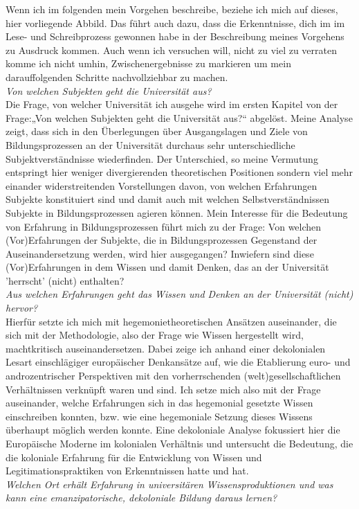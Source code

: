 Wenn ich im folgenden mein Vorgehen beschreibe, beziehe ich mich auf dieses,
hier vorliegende  Abbild. Das führt auch dazu, dass die Erkenntnisse, dich im
im Lese- und Schreibprozess gewonnen habe in der Beschreibung meines Vorgehens
zu Ausdruck kommen. Auch wenn ich versuchen will, nicht zu viel zu verraten
komme ich nicht umhin, Zwischenergebnisse zu markieren um mein darauffolgenden
Schritte nachvollziehbar zu machen.\\[0.75em]
\textit{Von welchen Subjekten geht die Universität aus?}\\
Die Frage, von
welcher Universität ich ausgehe wird im ersten Kapitel von der Frage:„Von
welchen Subjekten geht die Universität aus?“ abgelöst. Meine Analyse zeigt,
dass sich in den Überlegungen über Ausgangslagen und Ziele von
Bildungsprozessen an der Universität durchaus sehr unterschiedliche
Subjektverständnisse wiederfinden. Der Unterschied, so meine Vermutung
entspringt hier weniger divergierenden theoretischen Positionen sondern viel
mehr einander widerstreitenden Vorstellungen davon, von welchen Erfahrungen
Subjekte konstituiert sind und damit auch mit welchen Selbstverständnissen
Subjekte in Bildungsprozessen agieren können. Mein Interesse für die Bedeutung
von Erfahrung in Bildungsprozessen führt mich zu der Frage: Von welchen
(Vor)Erfahrungen der Subjekte, die in Bildungsprozessen Gegenstand der
Auseinandersetzung werden, wird hier ausgegangen? Inwiefern sind diese
(Vor)Erfahrungen in dem Wissen und damit Denken, das an der Universität
'herrscht' (nicht) enthalten?\\[0.75em]
\textit{Aus welchen Erfahrungen geht das Wissen und Denken an der Universität
(nicht) hervor?}\\ Hierfür setzte ich mich mit hegemonietheoretischen Ansätzen
auseinander, die sich mit der Methodologie, also der Frage wie Wissen
hergestellt wird, machtkritisch auseinandersetzen. Dabei zeige ich anhand einer
dekolonialen Lesart einschlägiger europäischer Denkansätze auf, wie die
Etablierung euro- und androzentrischer Perspektiven mit den vorherrschenden
(welt)gesellschaftlichen Verhältnissen verknüpft waren und sind. Ich setze mich
also mit der Frage auseinander, welche Erfahrungen sich in das hegemonial
gesetzte Wissen einschreiben konnten, bzw. wie eine hegemoniale Setzung dieses
Wissens überhaupt möglich werden konnte. Eine dekoloniale Analyse fokussiert
hier die Europäische Moderne im kolonialen Verhältnis und untersucht die
Bedeutung, die die koloniale Erfahrung für die Entwicklung von Wissen und
Legitimationspraktiken von Erkenntnissen hatte und hat.\\[0.75em]
\textit{Welchen Ort erhält Erfahrung in universitären Wissensproduktionen und
was kann eine emanzipatorische, dekoloniale Bildung daraus lernen? }\\

